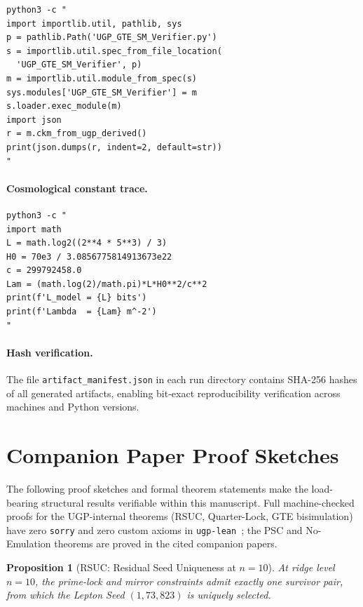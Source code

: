 \documentclass[11pt]{article}
\newtheorem{proposition}[theorem]{Proposition}
\theoremstyle{remark}
\begin{document}
\begin{appendices}
{\small
\begin{verbatim}
python3 -c "
import importlib.util, pathlib, sys
p = pathlib.Path('UGP_GTE_SM_Verifier.py')
s = importlib.util.spec_from_file_location(
  'UGP_GTE_SM_Verifier', p)
m = importlib.util.module_from_spec(s)
sys.modules['UGP_GTE_SM_Verifier'] = m
s.loader.exec_module(m)
import json
r = m.ckm_from_ugp_derived()
print(json.dumps(r, indent=2, default=str))
"
\end{verbatim}
}

\paragraph{Cosmological constant trace.}
{\small
\begin{verbatim}
python3 -c "
import math
L = math.log2((2**4 * 5**3) / 3)
H0 = 70e3 / 3.0856775814913673e22
c = 299792458.0
Lam = (math.log(2)/math.pi)*L*H0**2/c**2
print(f'L_model = {L} bits')
print(f'Lambda  = {Lam} m^-2')
"
\end{verbatim}
}

\paragraph{Hash verification.}
The file \texttt{artifact\_manifest.json} in each run directory contains SHA-256 hashes of all generated artifacts, enabling bit-exact reproducibility verification across machines and Python versions.

\section{Companion Paper Proof Sketches}
\label{app:proofs}

The following proof sketches and formal theorem statements make the load-bearing structural results verifiable within this manuscript.
Full machine-checked proofs for the UGP-internal theorems (RSUC, Quarter-Lock, GTE bisimulation) have zero \texttt{sorry} and zero custom axioms in \texttt{ugp-lean}~\cite{SpivackUGPFormalization,ugp-lean}; the PSC and No-Emulation theorems are proved in the cited companion papers.

\begin{proposition}[RSUC: Residual Seed Uniqueness at $n{=}10$]
\label{prop:rsuc_sketch}
At ridge level $n{=}10$, the prime-lock and mirror constraints admit exactly one survivor pair, from which the Lepton Seed $(1, 73, 823)$ is uniquely selected.
\end{proposition}


\end{appendices}
\end{document}
